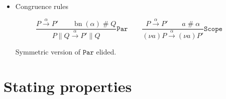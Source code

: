 \documentclass{article}
\newcommand{\new}[2]{(\nu\!#1) #2}
\newcommand{\freshFor}{\mathrel{\#}}
\DeclareMathOperator{\bn}{bn}
\begin{document}
\begin{itemize}
\item Congruence rules

\begin{equation*}
%
%
\frac{
P \xrightarrow{\alpha} P' \qquad
\bn(\alpha) \freshFor Q
}{
P \parallel Q \xrightarrow{\alpha} P' \parallel Q
}
\mathtt{Par}
%
\qquad
%
%
\frac{
P \xrightarrow{\alpha} P' \qquad
a \freshFor \alpha
}{
\new{a}{P} \xrightarrow{\alpha} \new{a}{P'}
}
\mathtt{Scope}
%
\qquad
\end{equation*}

Symmetric version of $\mathtt{Par}$ elided.

\end{itemize}

\section{Stating properties}

\newcommand{\node}{\mathtt{Node}}
\end{document}
